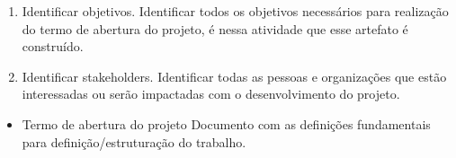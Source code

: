 \begin{enumerate}
	\item Identificar objetivos. 
		Identificar todos os objetivos necessários para realização do termo de abertura do projeto, é nessa atividade que esse artefato é construído.
	\item Identificar stakeholders.
		Identificar todas as pessoas e organizações que estão interessadas ou serão impactadas com o desenvolvimento do projeto. 
\end{enumerate}

\begin{itemize}
	\item Termo de abertura do projeto
	Documento com as definições fundamentais para definição/estruturação do trabalho. 
\end{itemize}
